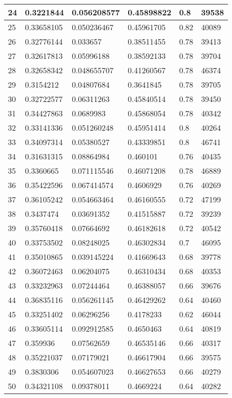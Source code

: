 \begin{longtable}{|l|l|l|l|l|l|}
24 & 0.3221844 & 0.056208577 & 0.45898822 & 0.8 & 39538 \\ \hline 
25 & 0.33658105 & 0.050236467 & 0.45961705 & 0.82 & 40089 \\ \hline 
26 & 0.32776144 & 0.033657 & 0.38511455 & 0.78 & 39413 \\ \hline 
27 & 0.32617813 & 0.05996188 & 0.38592133 & 0.78 & 39704 \\ \hline 
28 & 0.32658342 & 0.048655707 & 0.41260567 & 0.78 & 46374 \\ \hline 
29 & 0.3154212 & 0.04807684 & 0.3641845 & 0.78 & 39705 \\ \hline 
30 & 0.32722577 & 0.06311263 & 0.45840514 & 0.78 & 39450 \\ \hline 
31 & 0.34427863 & 0.0689983 & 0.45868054 & 0.78 & 40342 \\ \hline 
32 & 0.33141336 & 0.051260248 & 0.45951414 & 0.8 & 40264 \\ \hline 
33 & 0.34097314 & 0.05380527 & 0.43339851 & 0.8 & 46741 \\ \hline 
34 & 0.31631315 & 0.08864984 & 0.460101 & 0.76 & 40435 \\ \hline 
35 & 0.3360665 & 0.071115546 & 0.46071208 & 0.78 & 46889 \\ \hline 
36 & 0.35422596 & 0.067414574 & 0.4606929 & 0.76 & 40269 \\ \hline 
37 & 0.36105242 & 0.054663464 & 0.46160555 & 0.72 & 47199 \\ \hline 
38 & 0.3437474 & 0.03691352 & 0.41515887 & 0.72 & 39239 \\ \hline 
39 & 0.35760418 & 0.07664692 & 0.46182618 & 0.72 & 40542 \\ \hline 
40 & 0.33753502 & 0.08248025 & 0.46302834 & 0.7 & 46095 \\ \hline 
41 & 0.35010865 & 0.039145224 & 0.41669643 & 0.68 & 39778 \\ \hline 
42 & 0.36072463 & 0.06204075 & 0.46310434 & 0.68 & 40353 \\ \hline 
43 & 0.33232963 & 0.07244464 & 0.46388057 & 0.66 & 39676 \\ \hline 
44 & 0.36835116 & 0.056261145 & 0.46429262 & 0.64 & 40460 \\ \hline 
45 & 0.33251402 & 0.06296256 & 0.4178233 & 0.62 & 46044 \\ \hline 
46 & 0.33605114 & 0.092912585 & 0.4650463 & 0.64 & 40819 \\ \hline 
47 & 0.359936 & 0.07562659 & 0.46535146 & 0.66 & 40317 \\ \hline 
48 & 0.35221037 & 0.07179021 & 0.46617904 & 0.66 & 39575 \\ \hline 
49 & 0.3830306 & 0.054607023 & 0.46627653 & 0.66 & 40279 \\ \hline 
50 & 0.34321108 & 0.09378011 & 0.4669224 & 0.64 & 40282 \\ \hline 
\end{longtable}